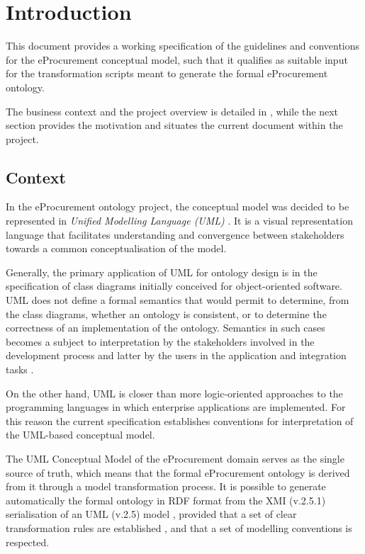 \section{Introduction}
\label{sec:introduction}
	
	This document provides a working specification of the guidelines and conventions for the eProcurement conceptual model, such that it qualifies as suitable input for the transformation scripts meant to generate the formal eProcurement ontology. 
	
	The business context and the project overview is detailed in \citet{costetchi2020a}, while the next section provides the motivation and situates the current document within the project.
	
	\subsection{Context}
	
	In the eProcurement ontology project, the conceptual model was decided \cite{d2.01-2017} to be represented in \textit{Unified Modelling Language (UML)} \citep{uml-userguide}. It is a visual representation language that facilitates understanding and convergence between stakeholders towards a common conceptualisation of the model. 
	
	Generally, the primary application of UML \citep{fowler2004} for ontology design is in the specification of class diagrams initially conceived for object-oriented software. UML does not define a formal semantics that would permit to determine, from the class diagrams, whether an ontology is consistent, or to determine the correctness of an implementation of the ontology. Semantics in such cases becomes a subject to interpretation by  the stakeholders involved in the development process and latter by the users in the application and integration tasks \cite{grunninger2003}.
	
	On the other hand, UML is closer than more logic-oriented approaches to the programming languages in which enterprise applications are implemented. For this reason the current specification establishes conventions for interpretation of the UML-based conceptual model.
		
	The UML Conceptual Model of the eProcurement domain serves as the single source of truth, which means that the formal eProcurement ontology is derived from it through a model transformation process. It is possible to generate automatically the formal ontology in RDF format \cite{rdf11} from the XMI (v.2.5.1) serialisation \cite{xmi2.5.1} of an UML (v.2.5) model \cite{uml2.5}, provided that a set of clear transformation rules are established \citep{costetchi2020c}, and that a set of modelling conventions is respected.
				
